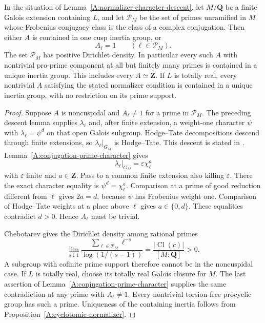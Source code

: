 \begin{proposition}
\label{A:full-support-normalizer}
In the situation of Lemma~\ref{A:normalizer-character-descent},
let $M/\mathbf Q$ be a finite Galois extension
containing $L$, and let $\mathcal P_M$ be the set of
primes unramified in $M$ whose Frobenius conjugacy
class is the class of a complex conjugation.
Then either $A$ is contained in one cusp inertia
group, or
\[
                       A_\ell=1
                     \qquad(\ell\in\mathcal P_M).
\]
The set $\mathcal P_M$ has positive Dirichlet density.
In particular every such $A$ with nontrivial
pro-prime component at all but finitely many primes
is contained in a unique inertia group. This includes
every $A\simeq\widehat{\mathbf Z}$. If $L$ is totally
real, every nontrivial $A$ satisfying the stated
normalizer condition is contained in a unique
inertia group, with no restriction on its prime
support.
\end{proposition}
\begin{proof}
Suppose $A$ is noncuspidal and $A_\ell\ne1$ for a
prime in $\mathcal P_M$. The preceding descent
lemma supplies $\lambda_\ell$ and, after finite
extension, a weight-one character $\psi$ with
$\lambda_\ell=\psi^d$ on that open Galois subgroup.
Hodge--Tate decompositions descend through finite
extensions, so $\lambda_\ell|_{G_M}$ is Hodge--Tate.
This descent is stated in
\cite[Chapter III, Appendix, Corollary 2 on
p.~III--32]{A_SerreAbelian}.
Lemma~\ref{A:conjugation-prime-character} gives
\[
              \lambda_\ell|_{G_M}
                         =\varepsilon\chi_\ell^a
\]
with $\varepsilon$ finite and $a\in\mathbf Z$.
Pass to a common finite extension also killing
$\varepsilon$. There the exact character equality is
$\psi^d=\chi_\ell^a$. Comparison at a prime of good
reduction different from $\ell$ gives $2a=d$,
because $\psi$ has Frobenius weight one. Comparison
of Hodge--Tate weights at a place above $\ell$
gives $a\in\{0,d\}$. These equalities contradict
$d>0$. Hence $A_\ell$ must be trivial.

Chebotarev gives the Dirichlet density among
rational primes
\[
 \lim_{s\downarrow1}
 \frac{\sum_{\ell\in\mathcal P_M}\ell^{-s}}
      {\log(1/(s-1))}
          =\frac{|\operatorname{Cl}(c)|}{[M:\mathbf Q]}>0.
\]
A subgroup with cofinite prime
support therefore cannot be in the noncuspidal
case. If $L$ is totally real, choose its totally
real Galois closure for $M$. The last assertion of
Lemma~\ref{A:conjugation-prime-character} supplies
the same contradiction at any prime with
$A_\ell\ne1$. Every nontrivial torsion-free procyclic
group has such a prime. Uniqueness of the containing
inertia follows from
Proposition~\ref{A:cyclotomic-normalizer}.
\end{proof}


